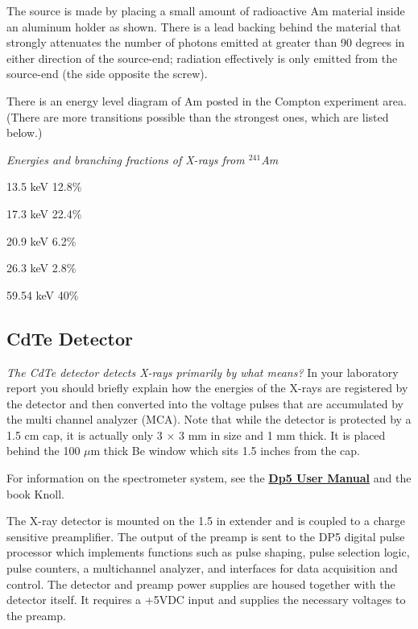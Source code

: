 \documentclass{../lab}
\begin{document}
The source is made by placing a small amount of radioactive Am material inside an aluminum holder as shown. There is a lead backing behind the material that strongly attenuates the number of photons emitted at greater than 90 degrees in either direction of the source-end; radiation effectively is only emitted from the source-end (the side opposite the screw).

There is an energy level diagram of Am posted in the Compton experiment area. (There are more transitions possible than the strongest ones, which are listed below.)

\emph{Energies and branching fractions of X-rays from $^{241}$Am}

13.5 keV 12.8\%

17.3 keV 22.4\%

20.9 keV 6.2\%

26.3 keV 2.8\%

59.54 keV 40\%

\subsection{CdTe Detector}

\emph{The CdTe detector detects X-rays primarily by what means?} In your laboratory report you should briefly explain how the energies of the X-rays are registered by the detector and then converted into the voltage pulses that are accumulated by the multi channel analyzer (MCA). Note that while the detector is protected by a 1.5 cm cap, it is actually only 3 $\times$ 3 mm in size and 1 mm thick. It is placed behind the 100 $\mu$m thick Be window which sits 1.5 inches from the cap.

For information on the spectrometer system, see the \href{http://experimentationlab.berkeley.edu/sites/default/files/images/DP5\_User\_Manual\_A1.pdf}{\textbf{Dp5 User Manual}} and the book Knoll.

The X-ray detector is mounted on the 1.5 in extender and is coupled to a charge sensitive preamplifier. The output of the preamp is sent to the DP5 digital pulse processor which implements functions such as pulse shaping, pulse selection logic, pulse counters, a multichannel analyzer, and interfaces for data acquisition and control. The detector and preamp power supplies are housed together with the detector itself. It requires a +5VDC input and supplies the necessary voltages to the preamp.
\end{document}
